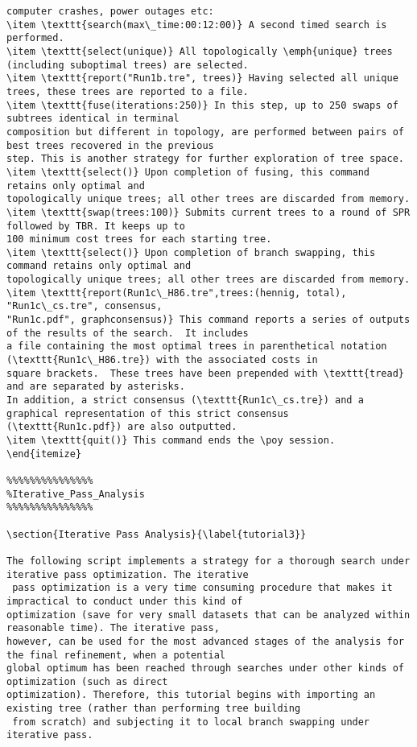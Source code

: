 \begin{verbatim}
computer crashes, power outages etc: 
\item \texttt{search(max\_time:00:12:00)} A second timed search is performed.  
\item \texttt{select(unique)} All topologically \emph{unique} trees (including suboptimal trees) are selected.
\item \texttt{report("Run1b.tre", trees)} Having selected all unique trees, these trees are reported to a file.  
\item \texttt{fuse(iterations:250)} In this step, up to 250 swaps of subtrees identical in terminal 
composition but different in topology, are performed between pairs of best trees recovered in the previous 
step. This is another strategy for further exploration of tree space.
\item \texttt{select()} Upon completion of fusing, this command retains only optimal and 
topologically unique trees; all other trees are discarded from memory.
\item \texttt{swap(trees:100)} Submits current trees to a round of SPR followed by TBR. It keeps up to 
100 minimum cost trees for each starting tree.
\item \texttt{select()} Upon completion of branch swapping, this command retains only optimal and 
topologically unique trees; all other trees are discarded from memory.
\item \texttt{report(Run1c\_H86.tre",trees:(hennig, total), "Run1c\_cs.tre", consensus,
"Run1c.pdf", graphconsensus)} This command reports a series of outputs of the results of the search.  It includes 
a file containing the most optimal trees in parenthetical notation (\texttt{Run1c\_H86.tre}) with the associated costs in 
square brackets.  These trees have been prepended with \texttt{tread} and are separated by asterisks. 
In addition, a strict consensus (\texttt{Run1c\_cs.tre}) and a graphical representation of this strict consensus
(\texttt{Run1c.pdf}) are also outputted.
\item \texttt{quit()} This command ends the \poy session.
\end{itemize}

%%%%%%%%%%%%%%%
%Iterative_Pass_Analysis
%%%%%%%%%%%%%%%

\section{Iterative Pass Analysis}{\label{tutorial3}}

The following script implements a strategy for a thorough search under iterative pass optimization. The iterative
 pass optimization is a very time consuming procedure that makes it impractical to conduct under this kind of 
optimization (save for very small datasets that can be analyzed within reasonable time). The iterative pass, 
however, can be used for the most advanced stages of the analysis for the final refinement, when a potential 
global optimum has been reached through searches under other kinds of optimization (such as direct 
optimization). Therefore, this tutorial begins with importing an existing tree (rather than performing tree building
 from scratch) and subjecting it to local branch swapping under iterative pass.


\end{verbatim}
